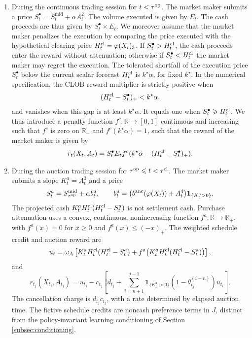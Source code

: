 \documentclass[11pt]{article}
\begin{document}
\begin{enumerate}
    \item During the continuous trading session for $t<\tau^{\mathrm{op}}$. The market maker submits a price $S_t^\bullet=S_t^\text{mid}+\alpha A_t^2$. The volume executed is given by $E_t$. The cash proceeds are thus given by $S_t^\bullet\times E_t$. We moreover assume that the market maker penalizes the execution by comparing the price executed with the hypothetical clearing price $H_t^{\mathrm{cl}} = \varphi(X_t)_3$. If $S_t^\bullet>H_t^{\mathrm{cl}}$, {the cash proceeds enter the reward without attenuation}; otherwise if $S_t^\bullet<H_t^{\mathrm{cl}}$ the market maker may regret the execution. {The tolerated shortfall of the execution price $S_t^\bullet$ below the current scalar forecast $H_t^{\mathrm{cl}}$ is $k^\star\alpha$, for fixed $k^\star$.} In the numerical specification, the CLOB reward multiplier is strictly positive when
\[(H_t^{\mathrm{cl}}-S_t^\bullet)_+<k^\star\alpha,\]
and vanishes when this gap is at least $k^\star\alpha$. It equals one when $S_t^\bullet\geqslant H_t^{\mathrm{cl}}$. We thus introduce a penalty function $f^c:\mathbb R\longrightarrow [0,1]$ continuous and increasing such that $f^c$ is zero on $\mathbb{R}_-$ and $f^c(k^\star\alpha)=1$, such that the reward of the market maker is given by 
\[r_t(X_t,A_t)= S_t^\bullet E_t f^c(k^\star \alpha -( H_t^{\mathrm{cl}} -S_t^\bullet)_+).\]
\item During the auction trading session for $\tau^{\mathrm{op}}\leqslant t<\tau^{\mathrm{cl}}$. The market maker submits a slope $K_t^a = A_t^3$ and a price
\[{S_t^a = S_{\tau^{\mathrm{op}}}^\mathrm{mid}+\alpha b_t^a,\qquad b_t^a=\bigl(b^{\mathrm{anc}}(\varphi(X_t))+A_t^4\bigr)\mathbf1_{\{K_t^a>0\}}.}\]
\begingroup
The projected cash $K_t^aH_t^{\mathrm{cl}}(H_t^{\mathrm{cl}}-S_t^a)$ is not settlement cash. Purchase attenuation uses a convex, continuous, nonincreasing function $f^a:\mathbb R\to\mathbb R_+$, with $f^a(x)=0$ for $x\geqslant0$ and $f^a(x)\leqslant(-x)_+$. The weighted schedule credit and auction reward are
\[
u_t=\omega_A\left[K_t^aH_t^{\mathrm{cl}}(H_t^{\mathrm{cl}}-S_t^a)
+f^a\!\left(K_t^aH_t^{\mathrm{cl}}(H_t^{\mathrm{cl}}-S_t^a)\right)\right],
\]
and
\[
r_{t_j}(X_{t_j},A_{t_j})=u_{t_j}-c_{t_j}\left[d_{t_j}+
\sum_{i=n+1}^{j-1}\mathbf1_{\{K_{t_i}^a>0\}}(1-\theta_{t_j}^{(i-n)})u_{t_i}\right].
\]
The cancellation charge is $d_{t_j}c_{t_j}$, with a rate determined by elapsed auction time. The fictive schedule credits are noncash preference terms in $J$, distinct from the policy-invariant learning conditioning of Section \ref{subsec:conditioning}.
\endgroup

\end{enumerate}
\end{document}

